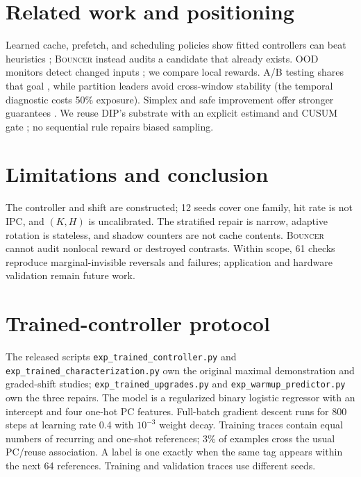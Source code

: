 \documentclass{article}
\newcommand{\system}{\textsc{Bouncer}\xspace}
\begin{document}
\section{Related work and positioning}
Learned cache, prefetch, and scheduling policies show fitted controllers can beat
heuristics \citep{ipek2008selfoptimizing,bera2021pythia,jain2016hawkeye,
shi2019glider,liu2020imitationcache}; \system instead audits a candidate that
already exists.  OOD monitors detect changed inputs
\citep{hendrycks2017baseline,gama2014survey}; we compare local rewards.  A/B
testing shares that goal \citep{kohavi2009controlled}, while partition leaders
avoid cross-window stability (the temporal diagnostic costs 50\% exposure).
Simplex and safe improvement offer stronger guarantees
\citep{sha2001simplicity,thomas2015hcpi}.  We reuse DIP's substrate
\citep{qureshi2007dip,jaleel2010rrip} with an explicit estimand and CUSUM gate
\citep{page1954cusum}; no sequential rule repairs biased sampling.

\section{Limitations and conclusion}

The controller and shift are constructed; 12 seeds cover one family, hit rate is
not IPC, and $(K,H)$ is uncalibrated.  The stratified repair is narrow, adaptive
rotation is stateless, and shadow counters are not cache contents.  \system cannot
audit nonlocal reward or destroyed contrasts.  Within scope, 61 checks reproduce
marginal-invisible reversals and failures; application and hardware validation
remain future work.

\clearpage



\clearpage
\appendix
\section{Trained-controller protocol}
\label{app:protocol}

The released scripts \texttt{exp\_trained\_controller.py} and
\texttt{exp\_trained\_characterization.py} own the original maximal demonstration
and graded-shift studies; \texttt{exp\_trained\_upgrades.py} and
\texttt{exp\_warmup\_predictor.py} own the three repairs.  The model is a
regularized binary logistic regressor
with an intercept and four one-hot PC features.  Full-batch gradient descent runs
for 800 steps at learning rate 0.4 with $10^{-3}$ weight decay.  Training traces
contain equal numbers of recurring and one-shot references; 3\% of examples cross
the usual PC/reuse association.  A label is one exactly when the same tag appears
within the next 64 references.  Training and validation traces use different
seeds.
\end{document}
